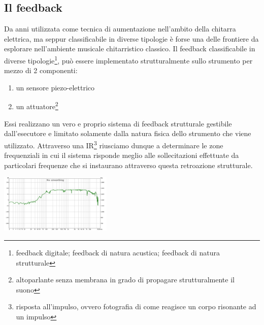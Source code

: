 \documentclass[oneside]{article}
\begin{document}
\begin{multicols*}{2}
\subsection{Il feedback} 
Da anni utilizzata come tecnica di aumentazione nell'ambito della chitarra elettrica, ma seppur classificabile in diverse tipologie è forse una delle frontiere da esplorare nell'ambiente musicale chitarristico classico. Il feedback classificabile in diverse tipologie\footnote{feedback digitale; feedback di natura acustica; feedback di natura strutturale}, può essere implementato strutturalmente sullo strumento per mezzo di 2 componenti: \begin{enumerate}\item un sensore piezo-elettrico\item un attuatore\footnote{altoparlante senza membrana in grado di propagare strutturalmente il suono} \end{enumerate} Essi realizzano un vero e proprio sistema di feedback strutturale gestibile dall'esecutore e limitato solamente dalla natura fisica dello strumento che viene utilizzato. Attraverso una IR\footnote{risposta all’impulso, ovvero fotografia di come reagisce un corpo risonante ad un impulso} riusciamo dunque a determinare le zone frequenziali in cui il sistema risponde meglio alle sollecitazioni effettuate da particolari frequenze che si instaurano attraverso questa retroazione strutturale.
\newline

\includegraphics[width=0.4\textwidth]{img/ir.png}


\end{multicols*}
\end{document}
